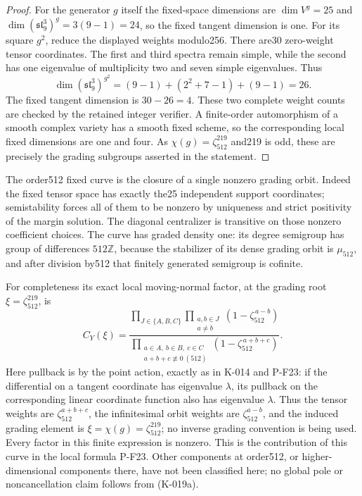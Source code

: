 \begin{proof}
For the generator $g$ itself the fixed-space dimensions are
$\dim V^g=25$ and
$\dim(\mathfrak{sl}_9^3)^g=3(9-1)=24$, so the fixed tangent
dimension is one.  For its square $g^2$, reduce the displayed
weights modulo256.  There are30 zero-weight tensor coordinates.
The first and third spectra remain simple, while the second has
one eigenvalue of multiplicity two and seven simple eigenvalues.
Thus
\[
\dim(\mathfrak{sl}_9^3)^{g^2}
  =(9-1)+(2^2+7-1)+(9-1)=26.
\]
The fixed tangent dimension is $30-26=4$.  These two complete
weight counts are checked by the retained integer verifier.
A finite-order automorphism of a smooth complex variety has a
smooth fixed scheme, so the corresponding local fixed dimensions
are one and four.  As $\chi(g)=\zeta_{512}^{219}$ and219 is odd,
these are precisely the grading subgroups asserted in the statement.
\end{proof}

The order512 fixed curve is the closure of a single nonzero
grading orbit.  Indeed the fixed tensor space has exactly the25
independent support coordinates; semistability forces all of them
to be nonzero by uniqueness and strict positivity of the margin
solution.  The diagonal centralizer is transitive on those
nonzero coefficient choices.  The curve has graded density one:
its degree semigroup has group of differences $512\mathbb Z$,
because the stabilizer of its dense grading orbit is $\mu_{512}$,
and after division by512 that finitely generated semigroup is
cofinite.

For completeness its exact local moving-normal factor, at the
grading root $\xi=\zeta_{512}^{219}$, is
\[
C_{Y}(\xi)=
\frac{\displaystyle\prod_{J\in\{A,B,C\}}
             \prod_{\substack{a,b\in J\\a\ne b}}
                         (1-\zeta_{512}^{\,a-b})}
     {\displaystyle\prod_{\substack{a\in A,\ b\in B,\ c\in C\\
                                    a+b+c\not\equiv0\ (512)}}
                         (1-\zeta_{512}^{\,a+b+c})}.
                                                               \tag{K-019a}
\]
Here pullback is by the point action, exactly as in K-014 and
P-F23: if the differential on a tangent coordinate has eigenvalue
$\lambda$, its pullback on the corresponding linear coordinate
function also has eigenvalue $\lambda$.  Thus the tensor weights
are $\zeta_{512}^{a+b+c}$, the infinitesimal orbit weights are
$\zeta_{512}^{a-b}$, and the induced grading element is
$\xi=\chi(g)=\zeta_{512}^{219}$; no inverse grading convention is
being used.
Every factor in this finite expression is nonzero.  This is the
contribution of this curve in the local formula P-F23.  Other
components at order512, or higher-dimensional components there,
have not been classified here; no global pole or noncancellation
claim follows from (K-019a).
